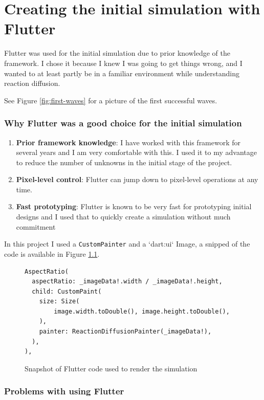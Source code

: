 
\chapter{Creating the initial simulation with Flutter}

Flutter was used for the initial simulation due to prior knowledge of the framework. I chose it because I knew I was going to get things wrong, and I wanted to at least partly be in a familiar environment while understanding reaction diffusion. 

See Figure \ref{fig:first-waves} for a picture of the first successful waves. 

\subsection{Why Flutter was a good choice for the initial simulation}

\begin{enumerate}
    \item \textbf{Prior framework knowledge}: I have worked with this framework for several years and I am very comfortable with this. I used it to my advantage to reduce the number of unknowns in the initial stage of the project. 
    \item \textbf{Pixel-level control}: Flutter can jump down to pixel-level operations at any time. 
    \item \textbf{Fast prototyping}: Flutter is known to be very fast for prototyping initial designs and I used that to quickly create a simulation without much commitment
\end{enumerate}

In this project I used a \verb|CustomPainter| and a `dart:ui` Image, a snipped of the code is available in Figure \ref{fig:flutter-painted-code}. 


\begin{figure}
    \centering
\begin{verbatim}
AspectRatio(
  aspectRatio: _imageData!.width / _imageData!.height,
  child: CustomPaint(
    size: Size(
        image.width.toDouble(), image.height.toDouble(),
    ),
    painter: ReactionDiffusionPainter(_imageData!),
  ),
),
\end{verbatim}
    \caption{Snapshot of Flutter code used to render the simulation}
    \label{fig:flutter-painted-code}
\end{figure}


\subsection{Problems with using Flutter}

